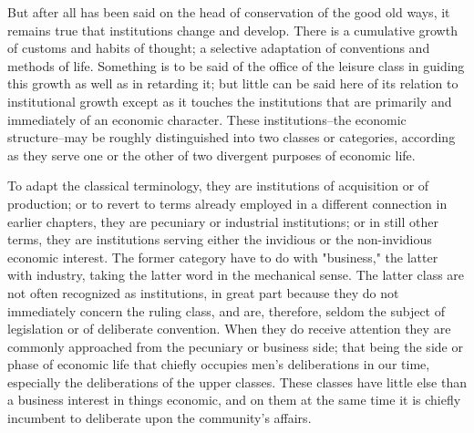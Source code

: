\documentclass[12pt]{report}
\begin{document}
But after all has been said on the head of conservation of the good old
ways, it remains true that institutions change and develop. There is
a cumulative growth of customs and habits of thought; a selective
adaptation of conventions and methods of life. Something is to be said
of the office of the leisure class in guiding this growth as well as
in retarding it; but little can be said here of its relation to
institutional growth except as it touches the institutions that
are primarily and immediately of an economic character. These
institutions--the economic structure--may be roughly distinguished into
two classes or categories, according as they serve one or the other of
two divergent purposes of economic life.

To adapt the classical terminology, they are institutions of acquisition
or of production; or to revert to terms already employed in a different
connection in earlier chapters, they are pecuniary or industrial
institutions; or in still other terms, they are institutions serving
either the invidious or the non-invidious economic interest. The former
category have to do with "business," the latter with industry, taking
the latter word in the mechanical sense. The latter class are not
often recognized as institutions, in great part because they do not
immediately concern the ruling class, and are, therefore, seldom the
subject of legislation or of deliberate convention. When they do receive
attention they are commonly approached from the pecuniary or business
side; that being the side or phase of economic life that chiefly
occupies men's deliberations in our time, especially the deliberations
of the upper classes. These classes have little else than a business
interest in things economic, and on them at the same time it is chiefly
incumbent to deliberate upon the community's affairs.
\end{document}
